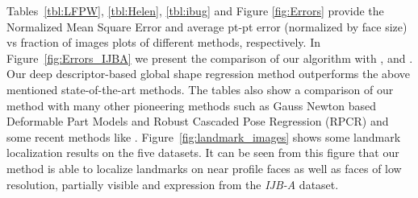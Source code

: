 \documentclass[10pt,twocolumn,letterpaper]{article}
\begin{document}
\begin{table}[thp!]
\begin{center}
\caption{Averaged error comparison of different methods on the LFPW dataset.} 
\label{tbl:LFPW}
\end{center}
\end{table}

Tables~\ref{tbl:LFPW}, \ref{tbl:Helen}, \ref{tbl:ibug} and Figure \ref{fig:Errors} provide the Normalized Mean Square Error and average pt-pt error (normalized by face size) vs fraction of images plots of different methods, respectively.  In Figure~\ref{fig:Errors_IJBA}  we present the comparison of our algorithm with \cite{AFW_dataset_CVPR2012}, \cite{Asthana:2013:RDR:2514950.2516059} and \cite{kazemi2014one}.  Our deep descriptor-based global shape regression method outperforms the above mentioned state-of-the-art methods. The tables also show a comparison of our method with many other pioneering methods such as Gauss Newton based Deformable Part Models \cite{6909635} and Robust Cascaded Pose Regression (RPCR) \cite{10.1109/ICCV.2013.191} and some recent methods like \cite{Zhu_2015_CVPR}.  Figure~\ref{fig:landmark_images} shows some landmark localization results on the five datasets. It can be seen from this figure that our method is able to localize landmarks on near profile faces as well as faces of low resolution, partially visible and expression from the \textit{IJB-A} dataset.  
\end{document}

